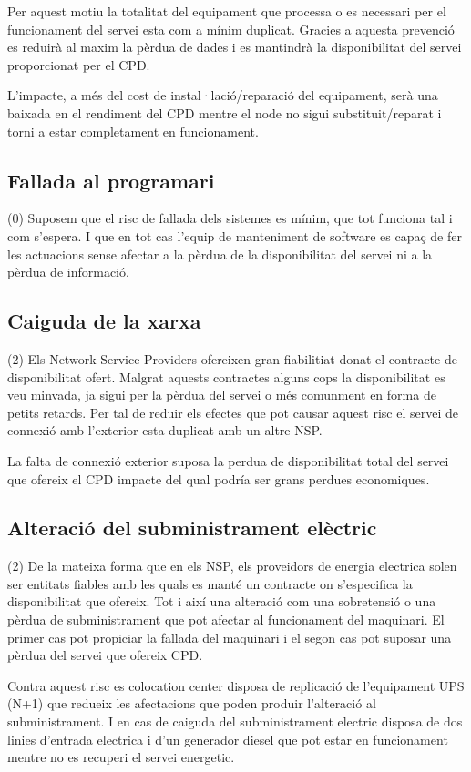 \documentclass[a4paper, 11pt]{article}
\begin{document}
Per aquest motiu la totalitat del equipament que processa o es necessari per el funcionament del servei esta com a mínim duplicat. Gracies a aquesta prevenció es reduirà al maxim la pèrdua de dades i es mantindrà la disponibilitat del servei proporcionat per el CPD. 

L'impacte, a més del cost de instal·lació/reparació del equipament, serà una baixada en el rendiment del CPD mentre el node no sigui substituit/reparat i torni a estar completament en funcionament.

\subsection{Fallada al programari}
(0) Suposem que el risc de fallada dels sistemes es mínim, que tot funciona tal i com s'espera. I que en tot cas l'equip de manteniment de software es capaç de fer les actuacions sense afectar a la pèrdua de la disponibilitat del servei ni a la pèrdua de informació. 

\subsection{Caiguda de la xarxa}
(2) Els Network Service Providers ofereixen gran fiabilitiat donat el contracte de disponibilitat ofert. Malgrat aquests contractes alguns cops la disponibilitat es veu minvada, ja sigui per la pèrdua del servei o més comunment en forma de petits retards. Per tal de reduir els efectes que pot causar aquest risc el servei de connexió amb l'exterior esta duplicat amb un altre NSP. 

La falta de connexió exterior suposa la perdua de disponibilitat total del servei que ofereix el CPD impacte del qual podría ser grans perdues economiques.

\subsection{Alteració del subministrament elèctric}
(2) De la mateixa forma que en els NSP, els proveidors de energia electrica solen ser entitats fiables amb les quals es manté un contracte on s'especifica la disponibilitat que ofereix. Tot i així una alteració com una sobretensió o una pèrdua de subministrament que pot afectar al funcionament del maquinari. El primer cas pot propiciar la fallada del maquinari i el segon cas pot suposar una pèrdua del servei que ofereix CPD.

Contra aquest risc es colocation center disposa de replicació de l'equipament UPS (N+1) que redueix les afectacions que poden produir l'alteració al subministrament. I en cas de caiguda del subministrament electric disposa de dos linies d'entrada electrica i d'un generador diesel que pot estar en funcionament mentre no es recuperi el servei energetic.
\end{document}
